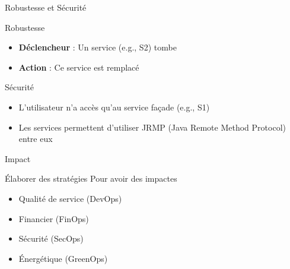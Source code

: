 \documentclass[aspectratio=169,10pt]{beamer}
\begin{document}
\begin{frame}{Robustesse et Sécurité}

\begin{center}

\end{center}

\begin{alertblock}{Robustesse}
  \begin{itemize}
    \item \textbf{Déclencheur} : Un service (e.g., S2) tombe
    \item \textbf{Action} : Ce service est remplacé
  \end{itemize}
\end{alertblock}

\begin{alertblock}{Sécurité}
  \begin{itemize}
    \item L'utilisateur n'a accès qu'au service façade (e.g., S1)
    \item Les services permettent d'utiliser JRMP (Java Remote Method Protocol) entre eux
  \end{itemize}
\end{alertblock}

\end{frame}


\begin{frame}{Impact}

\begin{alertblock}{Élaborer des stratégies}
Pour avoir des impactes
  \begin{itemize}
    \item Qualité de service (DevOps)
    \item Financier (FinOps)
    \item Sécurité (SecOps)
    \item Énergétique (GreenOps)
  \end{itemize}
\end{alertblock}

\end{frame}

\end{document}
